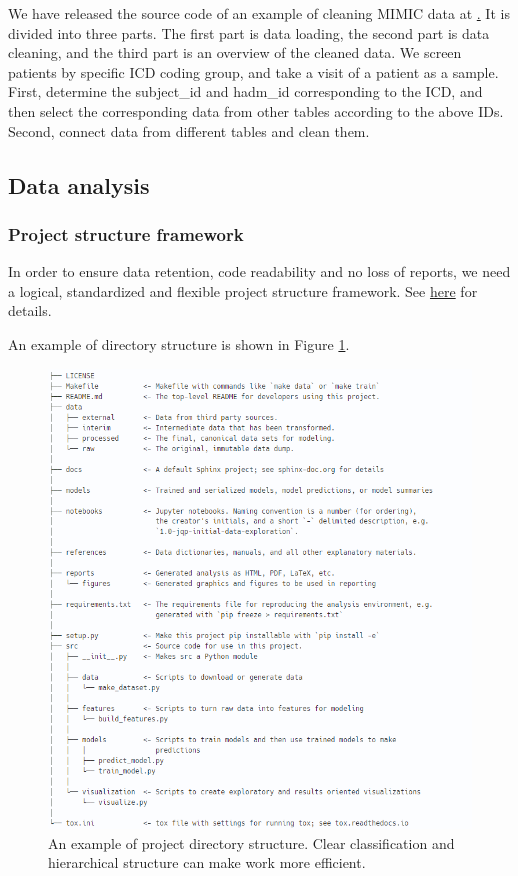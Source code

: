 We have released the source code of an example of cleaning MIMIC data at \href{}. It is divided into three parts. The first part is data loading, the second part is data cleaning, and the third part is an overview of the cleaned data. We screen patients by specific ICD coding group, and take a visit of a patient as a sample. First, determine the subject\_id and hadm\_id corresponding to the ICD, and then select the corresponding data from other tables according to the above IDs.
Second, connect data from different tables and clean them.

\subsection{Data analysis}%
\subsubsection{Project structure framework}

In order to ensure data retention, code readability and no loss of reports, we need a logical, standardized and flexible project structure framework. See \href{https://drivendata.github.io/cookiecutter-data-science/}{here} for details.

An example of directory structure is shown in Figure \ref{fig:directory_structure}.
\begin{figure}[ht]
    \centering
    \includegraphics[width=0.9\linewidth]{images/directory_structure.png}
    \caption{An example of project directory structure. Clear classification and hierarchical structure can make work more efficient.}
    \label{fig:directory_structure}
\end{figure}

